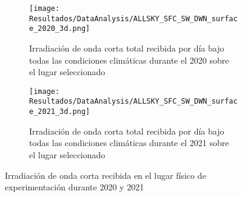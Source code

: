 			\begin{figure}[H]\ContinuedFloat
				\begin{subfigure}[t]{0.45\linewidth}
					\centering
					\texttt{[image: Resultados/DataAnalysis/ALLSKY\_SFC\_SW\_DWN\_surface\_2020\_3d.png]}
					\caption{Irradiación de onda corta total recibida por día bajo todas las condiciones climáticas durante el 2020 sobre el lugar seleccionado}
					\label{fig:ALLSKY_SFC_SW_DWN_surface_2020_3d}
				\end{subfigure}
				\hfill
				\begin{subfigure}[t]{0.45\linewidth}
					\centering
					\texttt{[image: Resultados/DataAnalysis/ALLSKY\_SFC\_SW\_DWN\_surface\_2021\_3d.png]}
					\caption{Irradiación de onda corta total recibida por día bajo todas las condiciones climáticas durante el 2021 sobre el lugar seleccionado}
					\label{fig:ALLSKY_SFC_SW_DWN_surface_2021_3d}
				\end{subfigure}
				\caption{Irradiación de onda corta recibida en el lugar físico de experimentación durante 2020 y 2021}
				\label{fig:SFC_SW_DWN}
			\end{figure}
			
	
	